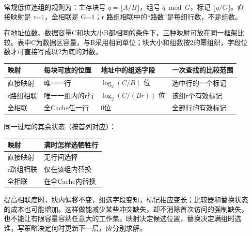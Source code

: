 常规低位选组的规则为：主存块号 \(q=\lfloor A/B\rfloor\)，组号 \(q\bmod G\)，标记 \(\lfloor q/G\rfloor\)。直接映射是 r=1，全相联是 G=1；r 路组相联中的``路数''是每组行数，不是组数。

在地址位数、数据容量C和块大小B都相同的条件下，三种映射可放在同一框架比较。表中C为数据区容量，与B采用相同单位；块大小和组数按2的幂组织，字段位数才可直接写成以2为底的对数。

\begin{wideblock}

\par\medskip\noindent\begin{minipage}{\linewidth}\fontsize{9.3}{12}\selectfont\begin{tabularx}{\linewidth}{@{}YYYY@{}}
\toprule\noalign{}
映射 & 每块可放的位置 & 地址中的组选字段 & 一次查找的比较范围 \\
\midrule\noalign{}


直接映射 & 唯一一行 & \(\log_2(C/B)\) 位 & 选中行的一个标记 \\
r路组相联 & 唯一一组内的r行 & \(\log_2(C/(Br))\) 位 & 该组r个有效标记 \\
全相联 & 全Cache任一行 & 0位 & 全部行的有效标记 \\
\bottomrule\end{tabularx}
\end{minipage}\par\medskip

\end{wideblock}

同一过程的其余状态（按首列对应）：

\par\medskip\noindent\begin{minipage}{\linewidth}\fontsize{9.3}{12}\selectfont\begin{tabularx}{\linewidth}{@{}YY@{}}
\toprule\noalign{}
映射 & 满时怎样选牺牲行 \\
\midrule\noalign{}


直接映射 & 无行间选择 \\
r路组相联 & 仅在该组内替换 \\
全相联 & 在全Cache内替换 \\
\bottomrule\end{tabularx}
\end{minipage}\par\medskip

提高相联度时，块内偏移不变，组选字段变短，标记相应变长；比较器和替换状态的成本也可能增加。这样做能减少某些冲突缺失，却不消除首次访问的强制缺失，也不能让有限容量容纳任意大的工作集。映射决定候选位置，替换决定满组时选谁，写策略决定何时更新下一层，应分别求解。

